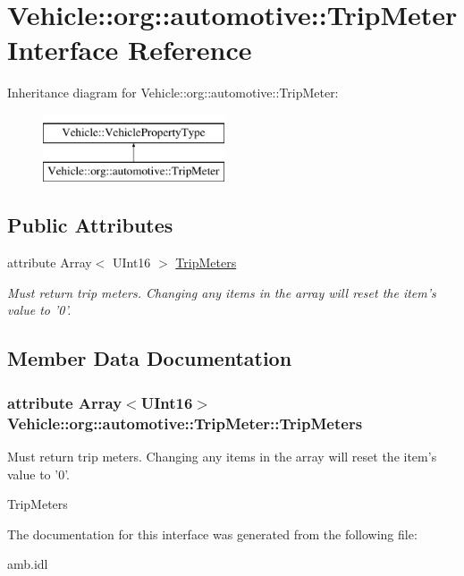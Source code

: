 \hypertarget{interfaceVehicle_1_1org_1_1automotive_1_1TripMeter}{\section{Vehicle\-:\-:org\-:\-:automotive\-:\-:Trip\-Meter Interface Reference}
\label{interfaceVehicle_1_1org_1_1automotive_1_1TripMeter}
}
Inheritance diagram for Vehicle\-:\-:org\-:\-:automotive\-:\-:Trip\-Meter\-:\begin{figure}[H]
\begin{center}
\leavevmode
\includegraphics[height=2.000000cm]{interfaceVehicle_1_1org_1_1automotive_1_1TripMeter}
\end{center}
\end{figure}
\subsection*{Public Attributes}
\begin{DoxyCompactItemize}
\item 
attribute Array$<$ U\-Int16 $>$ \hyperlink{interfaceVehicle_1_1org_1_1automotive_1_1TripMeter_addef8264363cfccfc43757c32b2d4611}{Trip\-Meters}
\begin{DoxyCompactList}\small\item\em Must return trip meters. Changing any items in the array will reset the item's value to '0'. \end{DoxyCompactList}\end{DoxyCompactItemize}


\subsection{Member Data Documentation}
\hypertarget{interfaceVehicle_1_1org_1_1automotive_1_1TripMeter_addef8264363cfccfc43757c32b2d4611}{
\subsubsection[{Trip\-Meters}]{\setlength{\rightskip}{0pt plus 5cm}attribute Array$<$U\-Int16$>$ Vehicle\-::org\-::automotive\-::\-Trip\-Meter\-::\-Trip\-Meters}}\label{interfaceVehicle_1_1org_1_1automotive_1_1TripMeter_addef8264363cfccfc43757c32b2d4611}


Must return trip meters. Changing any items in the array will reset the item's value to '0'. 

Trip\-Meters 

The documentation for this interface was generated from the following file\-:\begin{DoxyCompactItemize}
\item 
amb.\-idl\end{DoxyCompactItemize}
